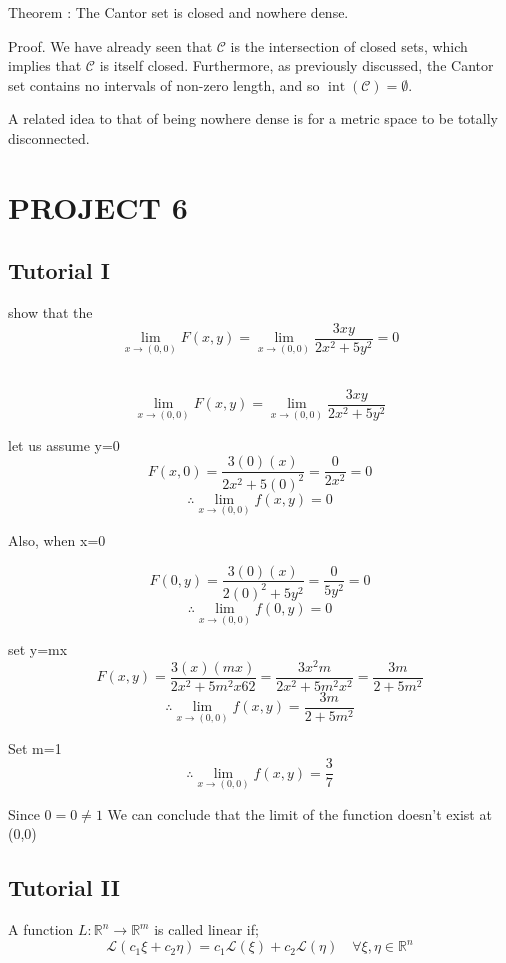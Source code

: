 \documentclass{article}
\begin{document}
\begin{itemize}
Theorem : The Cantor set is closed and nowhere dense.

Proof. We have already seen that $\mathcal{C}$ is the intersection of closed sets, which implies that $\mathcal{C}$ is itself closed. Furthermore, as previously discussed, the Cantor set contains no intervals of non-zero length, and so $\operatorname{int}(\mathcal{C})=\emptyset$.

A related idea to that of being nowhere dense is for a metric space to be totally disconnected.
\end{itemize}

\section{PROJECT 6}

\subsection{Tutorial I}
show that the 
$$\lim_{x \to(0,0)}F(x,y) = \lim_{x \to(0,0)} \frac{3xy}{2x^2+5y^2}=0$$

\\

\Large
$$\lim_{x \to(0,0)}F(x,y) = \lim_{x \to(0,0)} \frac{3xy}{2x^2+5y^2}$$

let us assume y=0
$$F(x,0) = \frac{3(0)(x)}{2x^2+5(0)^2} =\frac{0}{2x^2}=0$$
$$\therefore \lim_{x \to(0,0)} f(x,y) =0$$

Also, when x=0

$$F(0,y) = \frac{3(0)(x)}{2(0)^2+5y^2} =\frac{0}{5y^2}=0$$
$$\therefore \lim_{x \to(0,0)} f(0,y) =0$$

set y=mx
$$F(x,y) = \frac{3(x)(mx)}{2x^2+5m^2x62} =\frac{3x^2m}{2x^2+5m^2x^2}=\frac{3m}{2+5m^2}$$
$$\therefore \lim_{x \to(0,0)} f(x,y) =\frac{3m}{2+5m^2}$$

Set m=1
$$\therefore \lim_{x \to(0,0)} f(x,y) =\frac{3}{7}$$

Since $0=0 \neq 1$
We can conclude that the limit of the function doesn't exist at (0,0)

\subsection{Tutorial II}

A function $L: \mathbb{R}^{n} \rightarrow \mathbb{R}^{m}$ is called linear if;
$$
\mathcal{L}\left(c_{1} \xi+c_{2} \eta\right)=c_{1} \mathcal{L}(\xi)+c_{2} \mathcal{L}(\eta) \quad \forall \xi, \eta \in \mathbb{R}^{n}
$$
\end{document}
